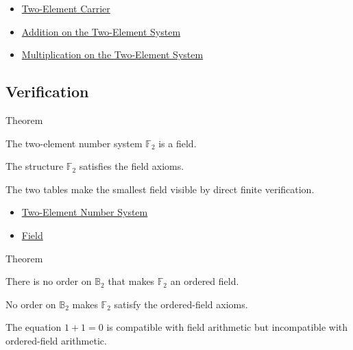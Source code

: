 \begin{dependencies}
\begin{itemize}
  \item \hyperref[def:two-element-carrier]{Two-Element Carrier}
  \item \hyperref[def:addition-on-two-element-system]{Addition on the Two-Element System}
  \item \hyperref[def:multiplication-on-two-element-system]{Multiplication on the Two-Element System}
\end{itemize}
\end{dependencies}

\subsection*{Verification}

\begin{theorembox}{Theorem}
\begin{theorem}
\label{thm:two-element-system-is-field}
The two-element number system \(\mathbb{F}_2\) is a field.
\end{theorem}

\begin{remark*}
The structure \(\mathbb{F}_2\) satisfies the field axioms.
\end{remark*}

\begin{remark*}[Interpretation]
The two tables make the smallest field visible by direct finite verification.
\end{remark*}
\end{theorembox}


\begin{dependencies}
\begin{itemize}
  \item \hyperref[def:two-element-number-system]{Two-Element Number System}
  \item \hyperref[def:abstract-field]{Field}
\end{itemize}
\end{dependencies}

\begin{theorembox}{Theorem}
\begin{theorem}
\label{thm:two-element-system-not-ordered-field}
There is no order on \(\mathbb{B}_2\) that makes
\(\mathbb{F}_2\) an ordered field.
\end{theorem}

\begin{remark*}
No order on \(\mathbb{B}_2\) makes \(\mathbb{F}_2\) satisfy the ordered-field axioms.
\end{remark*}

\begin{remark*}[Interpretation]
The equation \(1+1=0\) is compatible with field arithmetic but incompatible with ordered-field arithmetic.
\end{remark*}
\end{theorembox}


